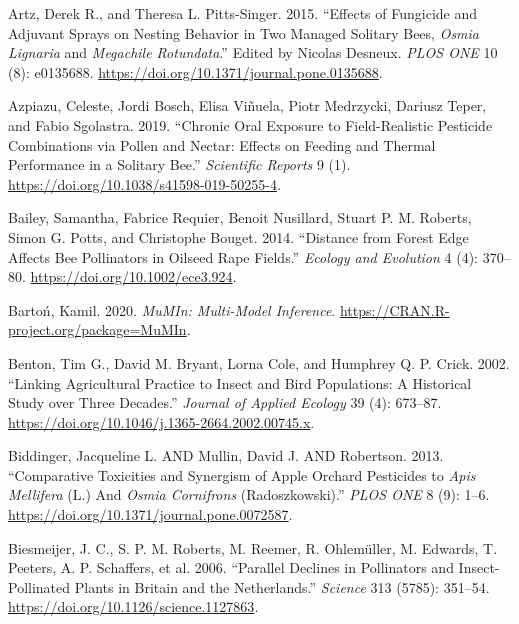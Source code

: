 \documentclass[smallextended]{svjour3}       %
\newlength{\cslhangindent}
\newenvironment{CSLReferences}[2] %
 {%
  \setlength{\parindent}{0pt}
  \ifodd #1 \everypar{\setlength{\hangindent}{\cslhangindent}}\ignorespaces\fi
  \ifnum #2 > 0
  \setlength{\parskip}{#2\baselineskip}
  \fi
 }%
 {}
\begin{document}
\hypertarget{refs}{}
\begin{CSLReferences}{1}{0}
\leavevmode{}%
Artz, Derek R., and Theresa L. Pitts-Singer. 2015. {``Effects of
Fungicide and Adjuvant Sprays on Nesting Behavior in Two Managed
Solitary Bees, \emph{{O}smia Lignaria} and \emph{{M}egachile
Rotundata}.''} Edited by Nicolas Desneux. \emph{{PLOS} {ONE}} 10 (8):
e0135688. \url{https://doi.org/10.1371/journal.pone.0135688}.

\leavevmode{}%
Azpiazu, Celeste, Jordi Bosch, Elisa Viñuela, Piotr Medrzycki, Dariusz
Teper, and Fabio Sgolastra. 2019. {``Chronic Oral Exposure to
Field-Realistic Pesticide Combinations via Pollen and Nectar: Effects on
Feeding and Thermal Performance in a Solitary Bee.''} \emph{Scientific
Reports} 9 (1). \url{https://doi.org/10.1038/s41598-019-50255-4}.

\leavevmode{}%
Bailey, Samantha, Fabrice Requier, Benoit Nusillard, Stuart P. M.
Roberts, Simon G. Potts, and Christophe Bouget. 2014. {``Distance from
Forest Edge Affects Bee Pollinators in Oilseed Rape Fields.''}
\emph{Ecology and Evolution} 4 (4): 370--80.
\url{https://doi.org/10.1002/ece3.924}.

\leavevmode{}%
Bartoń, Kamil. 2020. \emph{MuMIn: Multi-Model Inference}.
\url{https://CRAN.R-project.org/package=MuMIn}.

\leavevmode{}%
Benton, Tim G., David M. Bryant, Lorna Cole, and Humphrey Q. P. Crick.
2002. {``Linking Agricultural Practice to Insect and Bird Populations: A
Historical Study over Three Decades.''} \emph{Journal of Applied
Ecology} 39 (4): 673--87.
\url{https://doi.org/10.1046/j.1365-2664.2002.00745.x}.

\leavevmode{}%
Biddinger, Jacqueline L. AND Mullin, David J. AND Robertson. 2013.
{``Comparative Toxicities and Synergism of Apple Orchard Pesticides to
\emph{{A}pis Mellifera} ({L}.) And \emph{{O}smia Cornifrons}
({R}adoszkowski).''} \emph{PLOS ONE} 8 (9): 1--6.
\url{https://doi.org/10.1371/journal.pone.0072587}.

\leavevmode{}%
Biesmeijer, J. C., S. P. M. Roberts, M. Reemer, R. Ohlemüller, M.
Edwards, T. Peeters, A. P. Schaffers, et al. 2006. {``Parallel Declines
in Pollinators and Insect-Pollinated Plants in {B}ritain and the
{N}etherlands.''} \emph{Science} 313 (5785): 351--54.
\url{https://doi.org/10.1126/science.1127863}.


\end{CSLReferences}
\end{document}
